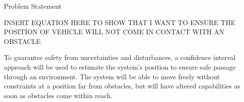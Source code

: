 \begin{section}{Problem Statement}
\begin{problem}
INSERT EQUATION HERE TO SHOW THAT I WANT TO ENSURE THE POSITION OF VEHICLE WILL NOT COME IN CONTACT WITH AN OBSTACLE

To guarantee safety from uncertainties and disturbances, a confidence interval approach will be used to estimate the system's position to ensure safe passage through an environment. The system will be able to move freely without constraints at a position far from obstacles, but will have altered capabilities as soon as obstacles come within reach.





	
\end{problem}

\end{section}